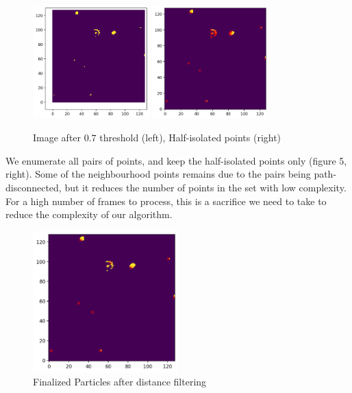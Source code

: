 \documentclass[11pt,a4paper]{scrartcl}
\begin{document}
\begin{figure}[H]
    \begin{center}
        \includegraphics[width = 0.4\textwidth]{img/booler.png}
        \includegraphics[width = 0.4\textwidth]{img/after_dfs}
    \end{center}
    \caption{Image after $0.7$ threshold (left), Half-isolated points (right)}
\end{figure}

We enumerate all pairs of points, and keep the half-isolated points only (figure 5, right). Some of the neighbourhood points remains due to the pairs being path-disconnected, but it reduces the number of points in the set with low complexity. For a high number of frames to process, this is a sacrifice we need to take to reduce the complexity of our algorithm.

\begin{figure}[H]
    \begin{center}
        \includegraphics[width = 0.5\textwidth]{img/dis_filter}
    \end{center}
    \caption{Finalized Particles after distance filtering}
\end{figure}
\end{document}
